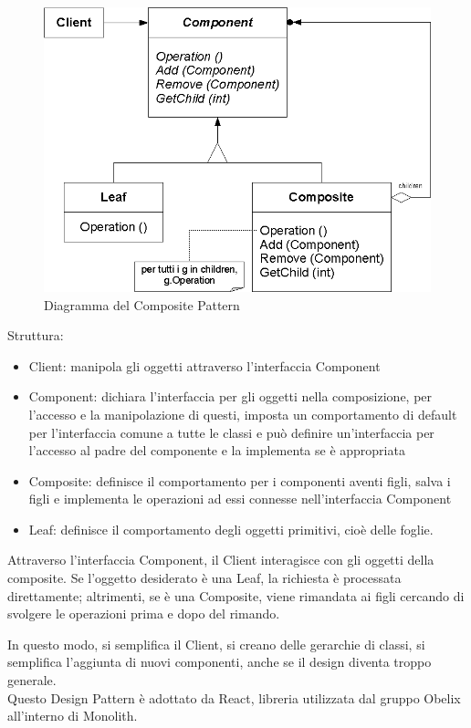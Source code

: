 	\FloatBarrier
	\begin{figure}[ht]
		\centering
		\includegraphics[scale=0.45]{img/Composite_Pattern.png}
		\caption{Diagramma del Composite Pattern}
	\end{figure}


Struttura:
\begin{itemize}
	\item Client: manipola gli oggetti attraverso l'interfaccia Component
	\item Component: dichiara l'interfaccia per gli oggetti nella composizione, per l'accesso e la manipolazione di questi, imposta un comportamento di default per l'interfaccia comune a tutte le classi e può definire un'interfaccia per l'accesso al padre del componente e la implementa se è appropriata
	\item Composite: definisce il comportamento per i componenti aventi figli, salva i figli e implementa le operazioni ad essi connesse nell'interfaccia Component
	\item Leaf: definisce il comportamento degli oggetti primitivi, cioè delle foglie.
\end{itemize}

Attraverso l'interfaccia Component, il Client interagisce con gli oggetti della composite. Se l'oggetto desiderato è una Leaf, la richiesta è processata direttamente; altrimenti, se è una Composite, viene rimandata ai figli cercando di svolgere le operazioni prima e dopo del rimando.

In questo modo, si semplifica il Client, si creano delle gerarchie di classi, si semplifica l'aggiunta di nuovi componenti, anche se il design diventa troppo generale. \\
Questo Design Pattern è adottato da React, libreria utilizzata dal gruppo Obelix all'interno di Monolith.
 
























